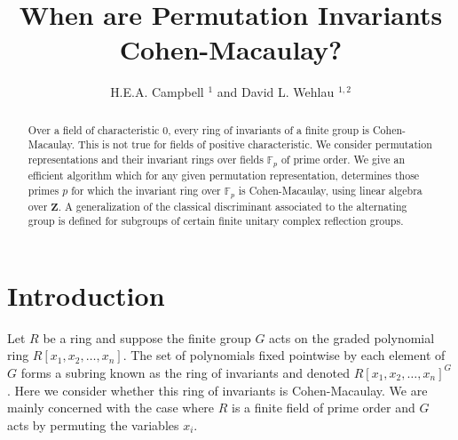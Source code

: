 \documentclass[12pt]{amsart}
\newcommand{\ZZ}{\mathbf{Z}} %
\newcommand{\ZZ}{\mathbb{Z}} %
\theoremstyle{definition}
\begin{document}
\pagestyle{plain} 
\title{When are Permutation Invariants Cohen-Macaulay?}



\begin{abstract}
  Over a field of characteristic 0, every ring of invariants of a finite group
is Cohen-Macaulay.  This is not true for fields of positive characteristic.  
We consider permutation representations and their invariant rings over 
fields $\mathbb{F}_p$ of prime order.   We give an efficient algorithm which for any given permutation representation, determines those primes $p$ for which the invariant ring over $\mathbb{F}_p$ is Cohen-Macaulay, using linear algebra over $\ZZ$.  A generalization of the classical discriminant associated to the alternating group is defined for subgroups of certain finite unitary complex reflection groups.
\end{abstract}





\keywords{}

\dedicatory{}

\author{H.E.A. Campbell $^{1}$ and David L. Wehlau $^{1,2}$}
\address{$^1$Department of Mathematics and Statistics, Queen's University, Kingston ON, Canada}
\address{$^2$Department of Mathematics and Computer Science, Royal Military College of Canada, Kingston ON, Canada}


\maketitle
\tableofcontents
 
\section{Introduction} \label{sec: intro}
  Let $R$ be a ring and suppose the finite group $G$ acts on the graded
  polynomial ring $R[x_1,x_2,\dots,x_n]$.  The set of polynomials fixed pointwise by each element of $G$ forms a subring known as the ring of 
  invariants and denoted $R[x_1,x_2,\dots,x_n]^G$.  Here we consider whether
  this ring of invariants is Cohen-Macaulay.  We are mainly concerned with the case where $R$ is a finite field of prime order and $G$ acts by permuting 
  the variables $x_i$.
\end{document}
